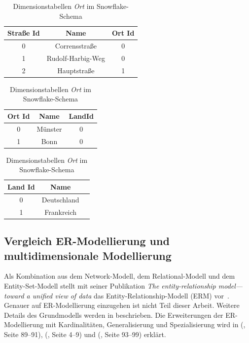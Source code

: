 \documentclass[
  language=german, %
  type=bachelor,%
  ngerman
]{isthesis}
\begin{document}
\begin{content}
  \begin{table}
    \footnotesize
    \begin{tabular}[t]{c c c }
      Straße Id & Name & Ort Id \\
      \toprule
      0 & Corrensstraße & 0 \\
      1 & Rudolf-Harbig-Weg & 0 \\
      2 & Hauptstraße & 1 \\
    \end{tabular}
		\hfill
    \begin{tabular}[t]{c c c}
      Ort Id & Name & LandId \\
      \toprule
      0 & Münster & 0 \\
      1 & Bonn & 0 \\
    \end{tabular}
		\hfill
    \begin{tabular}[t]{c c c }
      Land Id & Name \\
      \toprule
      0 & Deutschland \\
      1 & Frankreich \\
    \end{tabular}
    \caption{Dimensionstabellen \textit{Ort} im Snowflake-Schema}\label{table:dimension-table-snow}
  \end{table}

  \subsection{Vergleich \acrshort{ER}-Modellierung und multidimensionale Modellierung}

	Als Kombination aus dem Network-Modell, dem Relational-Modell und dem
	Entity-Set-Modell stellt \textsc{\citeauthor{chen1976entity}}
	\citeyear{chen1976entity} mit seiner Publikation \textit{\glqq{}The
	entity-relationship model—toward a unified view of data\grqq{}} das
	Entity-Relationship-Modell (\acrshort{ERM}) vor~\cite[][S.
	2]{chen1976entity}.  Genauer auf \acrshort{ER}-Modellierung einzugehen ist
	nicht Teil dieser Arbeit. Weitere Details des Grundmodells werden in
	\textsc{\cite{chen1976entity}} beschrieben. Die Erweiterungen der
	ER-Modellierung mit Kardinalitäten, Generalisierung und Spezialisierung wird
	in \textsc{\citeauthor{becker2004handelsinformationssysteme}}
	(\citeyear{becker2004handelsinformationssysteme}, Seite 89--91),
	\textsc{\citeauthor{becker2012grundsatze}} (\citeyear{becker2012grundsatze},
	Seite 4--9) und \textsc{\citeauthor{schutte2013grundsatze}}
	(\citeyear{schutte2013grundsatze}, Seite 93--99) erklärt.


\end{content}
\end{document}
